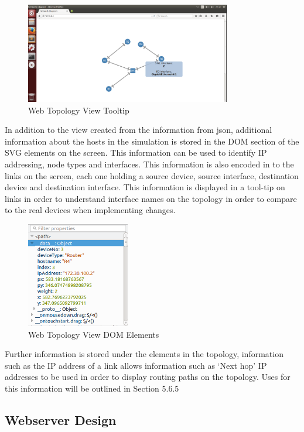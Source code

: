 \documentclass[11pt]{report}
\begin{document}
\begin{figure}[!]
	\caption{Web Topology View Tooltip}
	\centering
	\includegraphics[width=0.8\textwidth]{topologyWebHover.png}
\end{figure}

In addition to the view created from the information from json, additional information about the hosts in the simulation is stored in the DOM section of the SVG elements on the screen. This information can be used to identify IP addressing, node types and interfaces. This information is also encoded in to the links on the screen, each one holding a source device, source interface, destination device and destination interface. This information is displayed in a tool-tip on links in order to understand interface names on the topology in order to compare to the real devices when implementing changes.

\begin{figure}[!]
	\caption{Web Topology View DOM Elements}
	\centering
	\includegraphics[width=0.4\textwidth]{topologyWebDOM.png}
\end{figure}

Further information is stored under the elements in the topology, information such as the IP address of a link allows information such as `Next hop' IP addresses to be used in order to display routing paths on the topology. Uses for this information will be outlined in Section 5.6.5

\subsection{Webserver Design}
\end{document}
